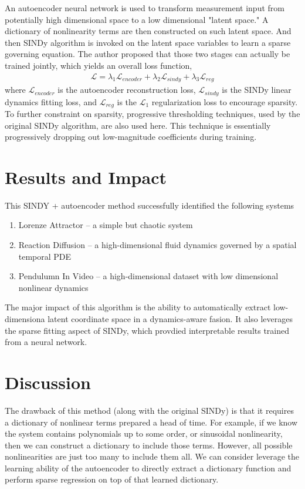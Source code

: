 \documentclass[12pt]{article}
\begin{document}
An autoencoder neural network is used to transform measurement input from potentially high
dimensional space to a low dimensional "latent space." A dictionary of nonlinearity terms
are then constructed on such latent space. And then SINDy algorithm is invoked on
the latent space variables to learn a sparse governing equation. The author proposed
that those two stages can actually be trained jointly, which yields an overall loss function,
\begin{gather}
  \mathcal{L} = \lambda_1\mathcal{L}_{encoder} +
                \lambda_2\mathcal{L}_{sindy} +
                \lambda_3\mathcal{L}_{reg}
\end{gather}
where $\mathcal{L}_{encoder}$ is the autoencoder reconstruction loss, $\mathcal{L}_{sindy}$ is the
SINDy linear dynamics fitting loss, and $\mathcal{L}_{reg}$ is the $\mathcal{L}_1$
regularization loss to encourage sparsity. To further constraint on sparsity, progressive
thresholding techniques, used by the original SINDy algorithm, are also used here.
This technique is essentially progressively dropping out low-magnitude coefficients
during training.

\section{Results and Impact}

This SINDY + autoencoder method successfully identified the following systems
\begin{enumerate}
  \item Lorenze Attractor -- a simple but chaotic system
  \item Reaction Diffusion -- a high-dimensional fluid dynamics governed by a spatial temporal PDE
  \item Pendulumn In Video -- a high-dimensional dataset with low dimensional nonlinear dynamics
\end{enumerate}
The major impact of this algorithm is the ability to automatically extract
low-dimensiona latent coordinate space in a dynamics-aware fasion. It also leverages
the sparse fitting aspect of SINDy, which provdied interpretable results trained from a neural
network.

\section{Discussion}

The drawback of this method (along with the original SINDy) is that it requires a dictionary
of nonlinear terms prepared a head of time. For example, if we know the system contains
polynomials up to some order, or sinusoidal nonlinearity, then we can construct a dictionary
to include those terms. However, all possible nonlinearities are just too many to include them
all. We can consider leverage the learning ability of the autoencoder to directly extract
a dictionary function and perform sparse regression on top of that learned dictionary.

\newpage



\end{document}
